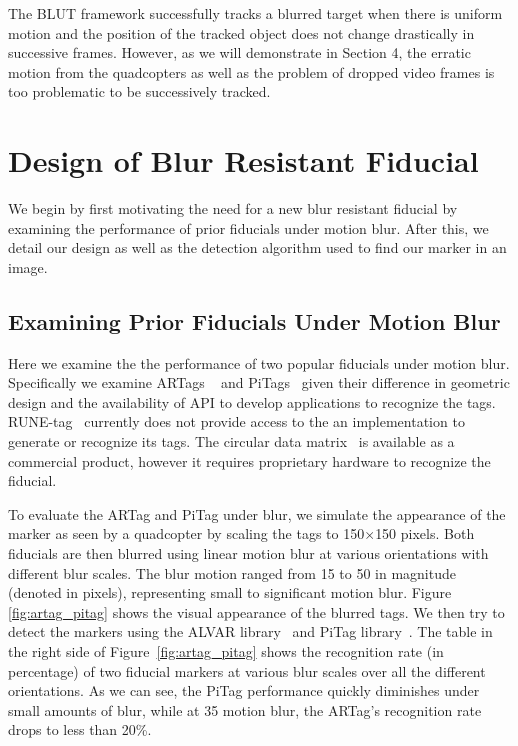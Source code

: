 \documentclass[10pt,twocolumn,letterpaper]{article}
\begin{document}
The BLUT framework successfully tracks a blurred target when there is uniform motion
and the position of the tracked object does not change drastically in successive
frames. However, as we will demonstrate in Section 4, the erratic motion from the quadcopters as well as the problem of dropped video frames is too problematic to be successively tracked.

\section{Design of Blur Resistant Fiducial}

We begin by first motivating the need for a new blur resistant fiducial by examining
the performance of prior fiducials under motion blur.  After this, we detail
our design as well as the detection algorithm used to find our marker in an image.

\subsection{Examining Prior Fiducials Under Motion Blur}\label{sec:blurtest}

Here we examine the the performance of two
popular fiducials under motion blur.  Specifically we examine ARTags
~\cite{Fiala05} and PiTags~\cite{Pitag13} given their difference in geometric
design and the availability of API to develop applications to recognize the tags.
RUNE-tag~\cite{runetag11} currently does not provide access to the an
implementation to generate or recognize its tags.  The circular data
matrix~\cite{NaimarkF02} is available as a commercial product, however it
requires proprietary hardware to recognize the fiducial.

To evaluate the ARTag and PiTag under blur, we simulate the appearance of the
marker as seen by a quadcopter by scaling the tags to 150$\times$150 pixels.
Both fiducials are then blurred using linear motion blur at various
orientations with different blur scales. The blur motion ranged from 15 to 50
in magnitude (denoted in pixels), representing small to significant motion
blur. Figure \ref{fig:artag_pitag} shows the visual appearance of the blurred
tags. We then try to detect the markers using the ALVAR library~\cite{alvar} and
PiTag library~\cite{ros_pitag}. The table in the right side of
Figure~\ref{fig:artag_pitag} shows the recognition rate (in percentage) of two
fiducial markers at various blur scales over all the different orientations.
As we can see, the PiTag performance quickly diminishes under small amounts of
blur, while at 35 motion blur, the ARTag's recognition rate drops to less than
20\%.
\end{document}
